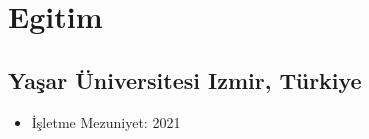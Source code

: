 \documentclass[11pt]{article}
\newcommand{\rside}[1]{
  \hfill {\normalfont\color{accent} #1}%
}
\begin{document}
\section{Egitim}
\subsection{Yaşar Üniversitesi \rside{Izmir, Türkiye}}
\begin{itemize}
    \item{İşletme \rside{Mezuniyet: 2021}}
\end{itemize}
\end{document}
